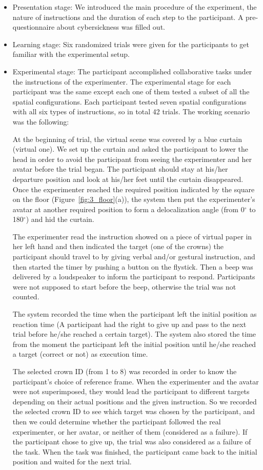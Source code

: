 \begin{itemize}
\item Presentation stage: We introduced the main procedure of the experiment, the nature of instructions and the duration of each step to the participant. A pre-questionnaire about cybersickness was filled out.
\item Learning stage: Six randomized trials were given for the participants to get familiar with the experimental setup.
\item Experimental stage: The participant accomplished collaborative tasks under the instructions of the experimenter. The experimental stage for each participant was the same except each one of them tested a subset of all the spatial configurations. Each participant tested seven spatial configurations with all six types of instructions, so in total 42 trials. The working scenario was the following:

At the beginning of trial, the virtual scene was covered by a blue curtain (virtual one). We set up the curtain and asked the participant to lower the head in order to avoid the participant from seeing the experimenter and her avatar before the trial began. The participant should stay at his/her departure position and look at his/her feet until the curtain disappeared. Once the experimenter reached the required position indicated by the square on the floor (Figure~\ref{fig:3_floor}(a)), the system then put the experimenter's avatar at another required position to form a delocalization angle (from 0$^\circ$ to 180$^\circ$) and hid the curtain.

The experimenter read the instruction showed on a piece of virtual paper in her left hand and then indicated the target (one of the crowns) the participant should travel to by giving verbal and/or gestural instruction, and then started the timer by pushing a button on the flystick. Then a beep was delivered by a loudspeaker to inform the participant to respond. Participants were not supposed to start before the beep, otherwise the trial was not counted.

The system recorded the time when the participant left the initial position as reaction time (A participant had the right to give up and pass to the next trial before he/she reached a certain target). The system also stored the time from the moment the participant left the initial position until he/she reached a target (correct or not) as execution time.

The selected crown ID (from 1 to 8) was recorded in order to know the participant's choice of reference frame. When the experimenter and the avatar were not superimposed, they would lead the participant to different targets depending on their actual positions and the given instruction. So we recorded the selected crown ID to see which target was chosen by the participant, and then we could determine whether the participant followed the real experimenter, or her avatar, or neither of them (considered as a failure). If the participant chose to give up, the trial was also considered as a failure of the task. When the task was finished, the participant came back to the initial position and waited for the next trial.


\end{itemize}

